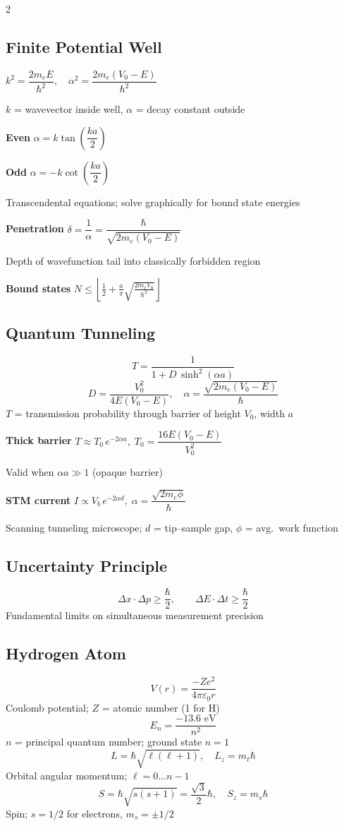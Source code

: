 \documentclass[9pt]{extarticle}
\newcommand{\eqlabel}[1]{\textbf{\scriptsize #1}\;}
\newcommand{\desc}[1]{{\small\color{desc}#1}}
\begin{document}
\begin{multicols}{2}
\subsection{Finite Potential Well}
$k^2 = \dfrac{2m_eE}{\hbar^2},\quad \alpha^2 = \dfrac{2m_e(V_0-E)}{\hbar^2}$

\desc{$k$ = wavevector inside well, $\alpha$ = decay constant outside}

\eqlabel{Even} $\alpha = k\tan\!\left(\dfrac{ka}{2}\right)$

\eqlabel{Odd} $\alpha = -k\cot\!\left(\dfrac{ka}{2}\right)$

\desc{Transcendental equations; solve graphically for bound state energies}

\eqlabel{Penetration} $\delta = \dfrac{1}{\alpha} = \dfrac{\hbar}{\sqrt{2m_e(V_0 - E)}}$

\desc{Depth of wavefunction tail into classically forbidden region}

\eqlabel{Bound states} $N \leq \left\lfloor \tfrac{1}{2} + \tfrac{a}{\pi}\sqrt{\tfrac{2m_eV_0}{\hbar^2}}\right\rfloor$

\subsection{Quantum Tunneling}
\[T = \frac{1}{1 + D\,\sinh^2(\alpha a)}\]
\[D = \frac{V_0^2}{4E(V_0-E)},\quad \alpha = \frac{\sqrt{2m_e(V_0-E)}}{\hbar}\]
\desc{$T$ = transmission probability through barrier of height $V_0$, width $a$}

\eqlabel{Thick barrier} $T \approx T_0\,e^{-2\alpha a},\; T_0 = \dfrac{16E(V_0-E)}{V_0^2}$

\desc{Valid when $\alpha a \gg 1$ (opaque barrier)}

\eqlabel{STM current} $I \propto V_b\,e^{-2\alpha d},\; \alpha = \dfrac{\sqrt{2m_e\phi}}{\hbar}$

\desc{Scanning tunneling microscope; $d$ = tip--sample gap, $\phi$ = avg.\ work function}

\subsection{Uncertainty Principle}
\[\Delta x\cdot\Delta p \geq \frac{\hbar}{2},\qquad \Delta E\cdot\Delta t \geq \frac{\hbar}{2}\]
\desc{Fundamental limits on simultaneous measurement precision}

\subsection{Hydrogen Atom}
\[V(r) = \frac{-Ze^2}{4\pi\varepsilon_0 r}\]
\desc{Coulomb potential; $Z$ = atomic number (1 for H)}
\[E_n = \frac{-13.6\text{ eV}}{n^2}\]
\desc{$n$ = principal quantum number; ground state $n=1$}
\[L = \hbar\sqrt{\ell(\ell+1)},\quad L_z = m_\ell\hbar\]
\desc{Orbital angular momentum; $\ell = 0\ldots n-1$}
\[S = \hbar\sqrt{s(s+1)} = \frac{\sqrt{3}}{2}\hbar,\quad S_z = m_s\hbar\]
\desc{Spin; $s = 1/2$ for electrons, $m_s = \pm 1/2$}


\end{multicols}
\end{document}
